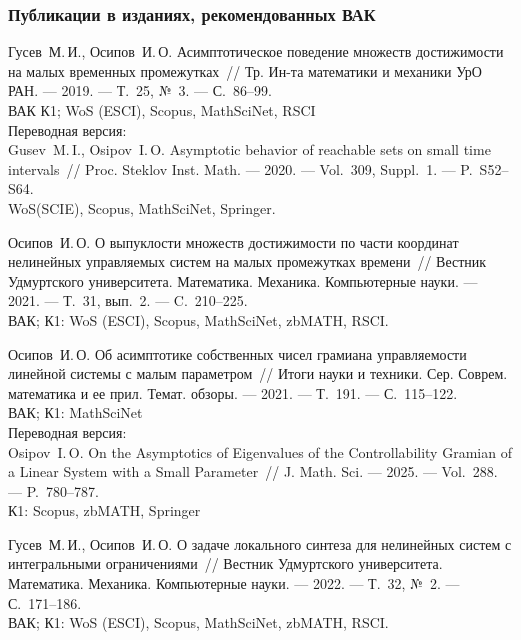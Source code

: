 \documentclass[../main.tex]{subfiles}
\begin{document}
\begin{thebibliography}{99}
\subsubsection*{Публикации в изданиях, рекомендованных ВАК}
Гусев~М.\,И., Осипов~И.\,О. Асимптотическое поведение множеств достижимости на малых временных промежутках~// Тр. Ин-та математики и механики УрО РАН. --- 2019. --- Т.~25, №~3. --- С.~86--99.
 \\
ВАК К1; WoS (ESCI), Scopus, MathSciNet, RSCI
\\ Переводная версия: \\
Gusev~M.\,I., Osipov~I.\,O. Asymptotic behavior of reachable sets on small time intervals~// Proc. Steklov Inst. Math. --- 2020. --- Vol.~309, Suppl.~1. --- P.~S52--S64.  \\
WoS(SCIE), Scopus, MathSciNet, Springer.

Осипов~И.\,О. О выпуклости множеств достижимости по части координат нелинейных управляемых систем на малых промежутках времени~// Вестник Удмуртского университета. Математика. Механика. Компьютерные науки. --- 2021. --- Т.~31, вып.~2. --- C.~210--225.
 \\
 ВАК; К1: WoS (ESCI), Scopus, MathSciNet, zbMATH, RSCI.

Осипов~И.\,О. Об асимптотике собственных чисел грамиана управляемости линейной системы с малым параметром~// Итоги науки и техники. Сер. Соврем. математика и ее прил. Темат. обзоры. --- 2021. --- Т.~191. --- С.~115--122.
\\ ВАК; К1: MathSciNet
\\Переводная версия: \\
Osipov~I.\,O. On the Asymptotics of Eigenvalues of the Controllability Gramian of a Linear System with a Small Parameter~// J. Math. Sci. --- 2025. --- Vol.~288. --- P.~780--787. 
 \\
К1: Scopus, zbMATH, Springer

Гусев~М.\,И., Осипов~И.\,О. О задаче локального синтеза для нелинейных систем с интегральными ограничениями~// Вестник Удмуртского университета. Математика. Механика. Компьютерные науки. --- 2022. --- Т.~32, №~2. --- С.~171--186. 
 \\
 ВАК; К1: WoS (ESCI), Scopus, MathSciNet, zbMATH, RSCI.



\end{thebibliography}
\end{document}
